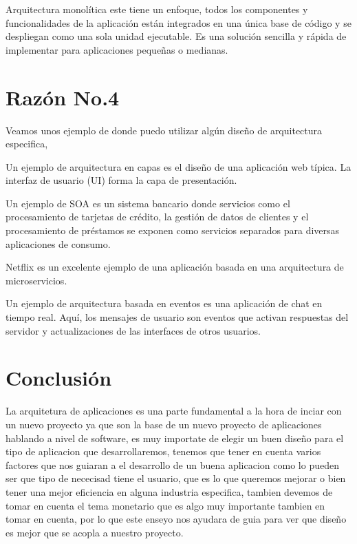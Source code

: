 \documentclass[11pt,letterpaper]{article}
\begin{document}
Arquitectura monolítica este tiene un enfoque, todos los componentes y funcionalidades de la aplicación están integrados en una única base de código y se despliegan como una sola unidad ejecutable. Es una solución sencilla y rápida de implementar para aplicaciones pequeñas o medianas.


\section{Razón No.4}

Veamos unos ejemplo de donde puedo utilizar algún diseño de arquitectura especifica,  

Un ejemplo de arquitectura en capas es el diseño de una aplicación web típica. La interfaz de usuario (UI) forma la capa de presentación.

Un ejemplo de SOA es un sistema bancario donde servicios como el procesamiento de tarjetas de crédito, la gestión de datos de clientes y el procesamiento de préstamos se exponen como servicios separados para diversas aplicaciones de consumo.

Netflix es un excelente ejemplo de una aplicación basada en una arquitectura de microservicios.

Un ejemplo de arquitectura basada en eventos es una aplicación de chat en tiempo real. Aquí, los mensajes de usuario son eventos que activan respuestas del servidor y actualizaciones de las interfaces de otros usuarios.




\section{Conclusión}

La arquitetura de aplicaciones es una parte fundamental a la hora de inciar con un nuevo proyecto ya que son la base de un nuevo proyecto de aplicaciones hablando a nivel de software, es muy importate de elegir un buen diseño para el tipo de aplicacion que desarrollaremos, tenemos que tener en cuenta varios factores que nos guiaran a el desarrollo de un buena aplicacion como lo pueden ser que tipo de nececisad tiene el usuario, que es lo que queremos mejorar o bien tener una mejor eficiencia en alguna industria especifica, tambien devemos de tomar en cuenta el tema monetario que es algo muy importante tambien en tomar en cuenta, por lo que este enseyo nos ayudara de guia para ver que diseño es mejor que se acopla a nuestro proyecto.


\end{document}
